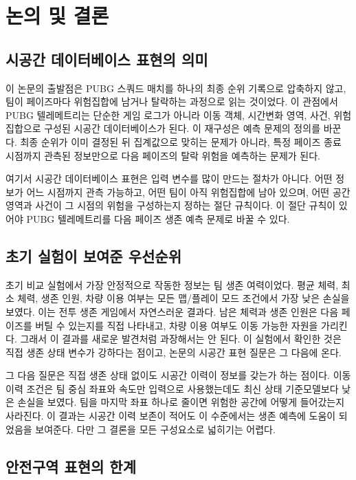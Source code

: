 \section{논의 및 결론}
\label{sec:discussion}

\subsection{시공간 데이터베이스 표현의 의미}

이 논문의 출발점은 PUBG 스쿼드 매치를 하나의 최종 순위 기록으로 압축하지 않고,
팀이 페이즈마다 위험집합에 남거나 탈락하는 과정으로 읽는 것이었다. 이 관점에서
PUBG 텔레메트리는 단순한 게임 로그가 아니라 이동 객체, 시간변화 영역, 사건,
위험집합으로 구성된 시공간 데이터베이스가 된다. 이 재구성은 예측 문제의 정의를
바꾼다. 최종 순위가 이미 결정된 뒤 집계값으로 맞히는 문제가 아니라, 특정 페이즈
종료 시점까지 관측된 정보만으로 다음 페이즈의 탈락 위험을 예측하는 문제가 된다.

여기서 시공간 데이터베이스 표현은 입력 변수를 많이 만드는 절차가 아니다. 어떤
정보가 어느 시점까지 관측 가능하고, 어떤 팀이 아직 위험집합에 남아 있으며, 어떤
공간 영역과 사건이 그 시점의 위험을 구성하는지 정하는 절단 규칙이다. 이 절단
규칙이 있어야 PUBG 텔레메트리를 다음 페이즈 생존 예측 문제로 바꿀 수 있다.

\subsection{초기 실험이 보여준 우선순위}

초기 비교 실험에서 가장 안정적으로 작동한 정보는 팀 생존 여력이었다. 평균 체력,
최소 체력, 생존 인원, 차량 이용 여부는 모든 맵/플레이 모드 조건에서 가장 낮은
손실을 보였다. 이는 전투 생존 게임에서 자연스러운 결과다. 남은 체력과 생존 인원은
다음 페이즈를 버틸 수 있는지를 직접 나타내고, 차량 이용 여부도 이동 가능한 자원을
가리킨다. 그래서 이 결과를 새로운 발견처럼 과장해서는 안 된다. 이 실험에서 확인한
것은 직접 생존 상태 변수가 강하다는 점이고, 논문의 시공간 표현 질문은 그 다음에
온다.

그 다음 질문은 직접 생존 상태 없이도 시공간 이력이 정보를 갖는가 하는 점이다. 이동 이력
조건은 팀 중심 좌표와 속도만 입력으로 사용했는데도 최신 상태 기준모델보다 낮은
손실을 보였다. 팀을 마지막 좌표 하나로 줄이면 위험한 공간에 어떻게 들어갔는지
사라진다. 이 결과는 시공간 이력 보존이 적어도 이 수준에서는 생존 예측에 도움이
되었음을 보여준다. 다만 그 결론을 모든 구성요소로 넓히기는 어렵다.

\subsection{안전구역 표현의 한계}

